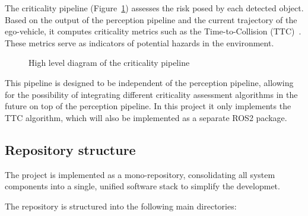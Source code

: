 The criticality pipeline (Figure~\ref{fig:cp_high_level}) assesses the risk posed by each detected
object. Based on the output of the perception pipeline and the current trajectory of the ego-vehicle,
it computes criticality metrics such as the Time-to-Collision (TTC)~\cite{cricitality_metrics}. These
metrics serve as indicators of potential hazards in the environment.


\begin{figure}[H]
  \centering
  \resizebox{0.2\textwidth}{!}{}
  \caption{High level diagram of the criticality pipeline}\label{fig:cp_high_level}
\end{figure}%

This pipeline is designed to be independent of the perception pipeline, allowing for
the possibility of integrating different criticality assessment algorithms in the future on top of the
perception pipeline. In this project it only implements the TTC algorithm, which will also be implemented 
as a separate ROS2 package.

\subsection{Repository structure}
\label{sec:RepositoryStructure}

The project is implemented as a mono-repository, consolidating all system components into a single, unified 
software stack to simplify the developmet.

The repository is structured into the following main directories:

